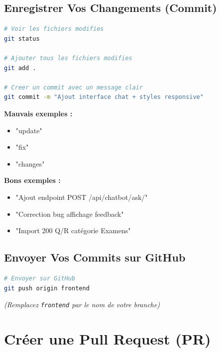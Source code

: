 \documentclass[11pt,a4paper]{article}
\begin{document}
\subsection{Enregistrer Vos Changements (Commit)}

\begin{lstlisting}[language=bash]
# Voir les fichiers modifies
git status

# Ajouter tous les fichiers modifies
git add .

# Creer un commit avec un message clair
git commit -m "Ajout interface chat + styles responsive"
\end{lstlisting}

\begin{astuce}
\textbf{Mauvais exemples :}
\begin{itemize}
    \item[\faIcon{times}] "update"
    \item[\faIcon{times}] "fix"
    \item[\faIcon{times}] "changes"
\end{itemize}

\textbf{Bons exemples :}
\begin{itemize}
    \item[\faIcon{check}] "Ajout endpoint POST /api/chatbot/ask/"
    \item[\faIcon{check}] "Correction bug affichage feedback"
    \item[\faIcon{check}] "Import 200 Q/R catégorie Examens"
\end{itemize}
\end{astuce}

\subsection{Envoyer Vos Commits sur GitHub}

\begin{lstlisting}[language=bash]
# Envoyer sur GitHub
git push origin frontend
\end{lstlisting}

\textit{(Remplacez \texttt{frontend} par le nom de votre branche)}

\clearpage

\section{Créer une Pull Request (PR)}
\label{sec:pull-request}
\end{document}
